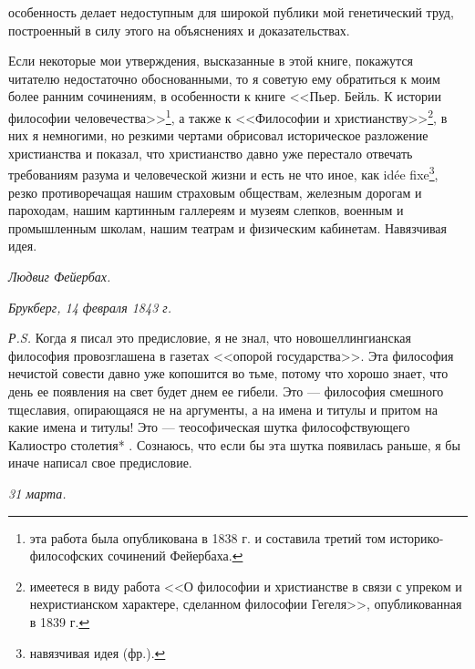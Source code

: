 \documentclass[12pt,oneside]{book}
\newcommand{\rom}[1]{\uppercase\expandafter{\romannumeral #1\relax}}
\begin{document}
особенность делает недоступным для широкой публики мой генетический труд, построенный в силу этого на объяснениях и доказательствах.

Если некоторые мои утверждения, высказанные в этой книге, покажутся читателю недостаточно обоснованными, то я советую ему обратиться к моим более ранним сочинениям, в особенности к книге <<Пьер. Бейль. К истории философии человечества>>\footnote{эта работа была опубликована в 1838 г. и составила третий том историко-философских сочинений Фейербаха.}, а также к <<Философии и христианству>>\footnote{имеетеся в виду работа <<О философии и христианстве в связи с упреком и нехристианском характере, сделанном философии Гегеля>>, опубликованная в 1839 г.}, в них я немногими, но резкими чертами обрисовал историческое разложение христианства и показал, что христианство давно уже перестало отвечать требованиям разума и человеческой жизни и есть не что иное, как id\' ee fixe\footnote{навязчивая идея (фр.).}, резко противоречащая нашим страховым обществам, железным дорогам и пароходам, нашим картинным галлереям и музеям слепков, военным и промышленным школам, нашим театрам и физическим кабинетам. Навязчивая идея. 

\bigskip
\hfill\emph{Людвиг Фейербах.}

\hfill\emph{Брукберг, 14 февраля 1843 г.}

\bigskip

\emph{Р.S.} Когда я писал это предисловие, я не знал, что новошеллингианская философия провозглашена в газетах <<опорой государства>>. Эта философия нечистой совести давно уже копошится во тьме, потому что хорошо знает, что день ее появления на свет будет днем ее гибели. Это --- философия смешного тщеславия, опирающаяся не на аргументы, а на имена и титулы и притом на какие имена и титулы! Это --- теософическая шутка философствующего Калиостро \rom{19} столетия*\let\svthefootnote\thefootnote
\let\thefootnote\relax{}\let\thefootnote\svthefootnote. Сознаюсь, что если бы эта шутка появилась раньше, я бы иначе написал свое предисловие.

\bigskip

\hfill\emph{31 марта.}

\bigskip
\end{document}
